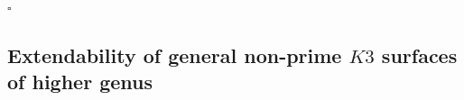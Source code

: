 \documentclass[11pt,twoside]{amsart}
\theoremstyle{plain}
\numberwithin{equation}{section}
\theoremstyle{definition}
\newcommand*{\QEDB}{\hfill\ensuremath{\square}}
\begin{document}

\QEDB

\subsection{Extendability of general non-prime $K3$ surfaces of higher genus}
\end{document}

